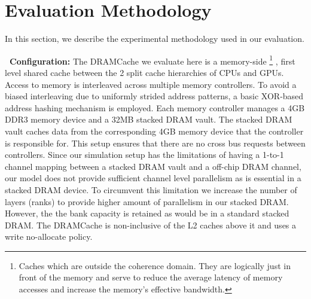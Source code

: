\section{Evaluation Methodology} \label{methodology}
In this section, we describe the experimental methodology used in our evaluation. 

\par \textbf{\cachename\ Configuration:} The DRAMCache we evaluate here is a memory-side \footnote{Caches which are outside the coherence domain. They are logically just in front of the memory and serve to reduce the average latency of memory accesses and increase the memory's effective bandwidth.}  \cite{skylake}, 
first level shared cache between the 2 split cache hierarchies of CPUs and GPUs. Access to memory is interleaved across multiple memory controllers. To avoid a biased interleaving due to uniformly strided address patterns, a basic XOR-based address hashing mechanism is employed. Each memory controller manages a 4GB DDR3 memory device and a 32MB stacked DRAM vault. The stacked DRAM vault caches data from the corresponding 4GB memory device that the controller is responsible for. This setup ensures that there are no cross bus requests between controllers. Since our simulation setup has the limitations of having a 1-to-1 channel mapping between a stacked DRAM vault and a off-chip DRAM channel, our model does not provide sufficient channel level parallelism as is essential in a stacked DRAM device. To circumvent this limitation we increase the number of layers (ranks) to provide higher amount of parallelism in our stacked DRAM. However, the the bank capacity is retained as would be in a standard stacked DRAM. The DRAMCache is non-inclusive  \cite{coherence-dramcache} of the L2 caches above it and uses a write no-allocate policy.

